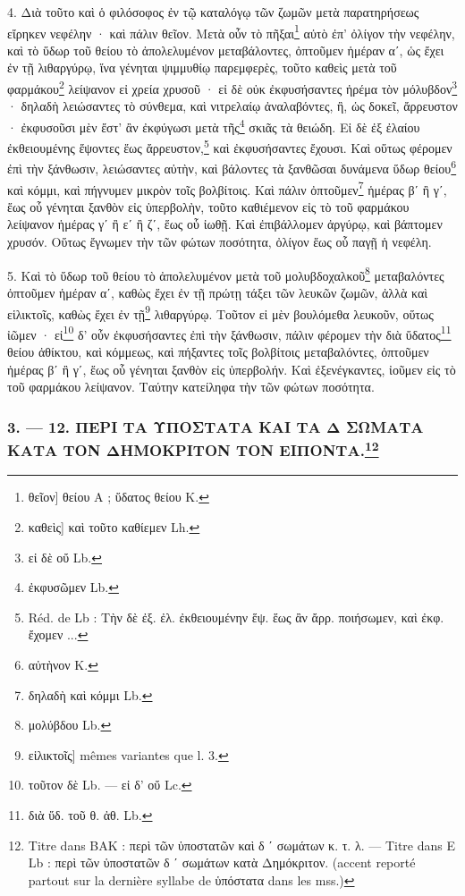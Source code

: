 \documentclass[landscape, a4paper, 11pt, oneside, polutonikogreek, french]{article}
\begin{document}
4. Διὰ τοῦτο καὶ ὁ φιλόσοφος ἐν τῷ καταλόγῳ τῶν ζωμῶν μετὰ παρατηρήσεως εἴρηκεν νεφέλην · καὶ πάλιν θεῖον. Μετὰ οὖν τὸ πῆξαι\footnote{θεῖον] θείου A ; ὕδατος θείου K.} αὐτὸ ἐπ' ὀλίγον τὴν νεφέλην, καὶ τὸ ὕδωρ τοῦ θείου τὸ ἀπολελυμένον μεταβάλοντες, ὀπτοῦμεν ἡμέραν αʹ, ὡς ἔχει ἐν τῇ λιθαργύρῳ, ἵνα γένηται ψιμμυθίῳ παρεμφερὲς, τοῦτο καθεὶς μετὰ τοῦ φαρμάκου\footnote{καθεὶς] καὶ τοῦτο καθίεμεν Lh.} λείψανον εἰ χρεία χρυσοῦ · εἰ δὲ οὐκ ἐκφυσήσαντες ἠρέμα τὸν μόλυβδον\footnote{εἰ δὲ οὔ Lb.} · δηλαδὴ λειώσαντες τὸ σύνθεμα, καὶ νιτρελαίῳ ἀναλαβόντες, ἢ, ὡς δοκεῖ, ἄρρευστον · ἐκφυσοῦσι μὲν ἔστ' ἂν ἐκφύγωσι μετὰ τῆς\footnote{ἐκφυσῶμεν Lb.} σκιᾶς τὰ θειώδη. Εἰ δὲ ἐξ ἐλαίου ἐκθειουμένης ἕψοντες ἕως ἄρρευστον,\footnote{Réd. de Lb : Τὴν δὲ ἐξ. ἐλ. ἐκθειουμένην ἕψ. ἕως ἂν ἄρρ. ποιήσωμεν, καὶ ἐκφ. ἔχομεν ...} καὶ ἐκφυσήσαντες ἔχουσι. Καὶ οὕτως φέρομεν ἐπὶ τὴν ξάνθωσιν, λειώσαντες αὐτὴν, καὶ βάλοντες τὰ ξανθῶσαι δυνάμενα ὕδωρ θείου\footnote{αὐτὴνον K.} καὶ κόμμι, καὶ πήγνυμεν μικρὸν τοῖς βολβίτοις. Καὶ πάλιν ὀπτοῦμεν\footnote{δηλαδὴ καὶ κόμμι Lb.} ἡμέρας βʹ ἢ γʹ, ἕως οὗ γένηται ξανθὸν εἰς ὑπερβολὴν, τοῦτο καθιέμενον εἰς τὸ τοῦ φαρμάκου λείψανον ἡμέρας γʹ ἢ εʹ ἢ ζʹ, ἕως οὗ ἰωθῇ. Καὶ ἐπιβάλλομεν ἀργύρῳ, καὶ βάπτομεν χρυσόν. Οὕτως ἔγνωμεν τὴν τῶν φώτων ποσότητα, ὀλίγον ἕως οὗ παγῇ ἡ νεφέλη.

5. Καὶ τὸ ὕδωρ τοῦ θείου τὸ ἀπολελυμένον μετὰ τοῦ μολυβδοχαλκοῦ\footnote{μολύβδου Lb.} μεταβαλόντες ὀπτοῦμεν ἡμέραν αʹ, καθὼς ἔχει ἐν τῇ πρώτῃ τάξει τῶν λευκῶν ζωμῶν, ἀλλὰ καὶ εἱλικτοῖς, καθὼς ἔχει ἐν τῇ\footnote{εἱλικτοῖς] mêmes variantes que l. 3.} λιθαργύρῳ. Τοῦτον εἰ μὲν βουλόμεθα λευκοῦν, οὕτως ἰῶμεν · εἰ\footnote{τοῦτον δὲ Lb. --- εἰ δ' οὔ Lc.} δ' οὖν ἐκφυσήσαντες ἐπὶ τὴν ξάνθωσιν, πάλιν φέρομεν τὴν διὰ ὕδατος\footnote{διὰ ὕδ. τοῦ θ. ἀθ. Lb.} θείου ἀθίκτου, καὶ κόμμεως, καὶ πήξαντες τοῖς βολβίτοις μεταβαλόντες, ὀπτοῦμεν ἡμέρας βʹ ἢ γʹ, ἕως οὗ γένηται ξανθὸν εἰς ὑπερβολήν. Καὶ ἐξενέγκαντες, ἰοῦμεν εἰς τὸ τοῦ φαρμάκου λείψανον. Ταύτην κατείληφα τὴν τῶν φώτων ποσότητα.

\bigskip
\centerline{\EightStarTaper}
\centerline{\EightStarTaper\EightStarTaper}
\bigskip

\subsubsection[3. --- 12. ΠΕΡΙ ΤΑ ΥΠΟΣΤΑΤΑ ΚΑΙ ΤΑ Δ ΣΩΜΑΤΑ ΚΑΤΑ ΤΟΝ ΔΗΜΟΚΡΙΤΟΝ ΤΟΝ ΕΙΠΟΝΤΑ.]{3. --- 12. ΠΕΡΙ ΤΑ ΥΠΟΣΤΑΤΑ ΚΑΙ ΤΑ Δ ΣΩΜΑΤΑ ΚΑΤΑ ΤΟΝ ΔΗΜΟΚΡΙΤΟΝ ΤΟΝ ΕΙΠΟΝΤΑ.\footnote{Titre dans BAK : περὶ τῶν ὑποστατῶν καὶ δ ʹ σωμάτων κ. τ. λ. --- Titre dans E Lb : περὶ τῶν ὑποστατῶν δ ʹ σωμάτων κατὰ Δημόκριτον. (accent reporté partout sur la dernière syllabe de ὑπόστατα dans les mss.)}}
\end{document}
